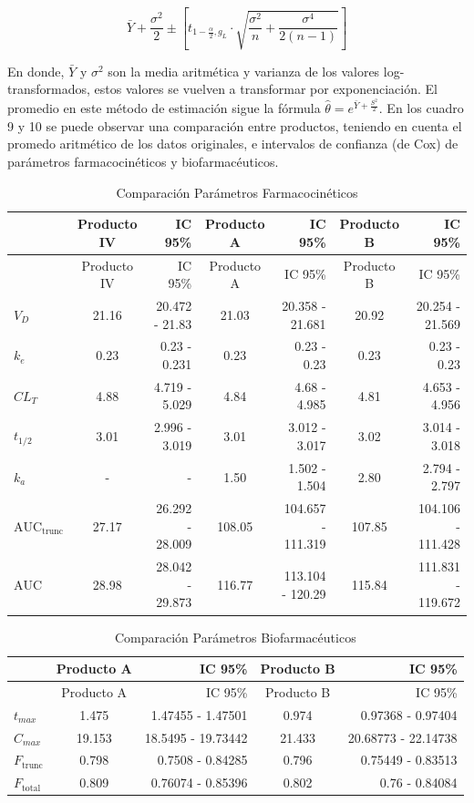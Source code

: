 \documentclass[]{article}
\begin{document}
\[\bar{Y} + \frac{\sigma^{2}}{2} \pm \left [ t_{1-\frac{\alpha}{2},g_{L}} \cdot \sqrt{\frac{\sigma^{2}}{n} + \frac{\sigma^{4}}{2(n-1)}} \right]\]

En donde, \(\bar{Y}\) y \(\sigma^{2}\) son la media aritmética y
varianza de los valores log-transformados, estos valores se vuelven a
transformar por exponenciación. El promedio en este método de estimación
sigue la fórmula \(\hat{\theta} = e^{\bar{Y}+\frac{S^{2}}{2}}\). En los
cuadro 9 y 10 se puede observar una comparación entre productos,
teniendo en cuenta el promedo aritmético de los datos originales, e
intervalos de confianza (de Cox) de parámetros farmacocinéticos y
biofarmacéuticos.

\begin{longtable}[]{@{}lcrcrcr@{}}
\caption{Comparación Parámetros Farmacocinéticos}\tabularnewline
\toprule
& Producto IV & IC 95\% & Producto A & IC 95\% & Producto B & IC
95\%\tabularnewline
\midrule
\endfirsthead
\toprule
& Producto IV & IC 95\% & Producto A & IC 95\% & Producto B & IC
95\%\tabularnewline
\midrule
\endhead
\(V_{D}\) & 21.16 & 20.472 - 21.83 & 21.03 & 20.358 - 21.681 & 20.92 &
20.254 - 21.569\tabularnewline
\(k_{e}\) & 0.23 & 0.23 - 0.231 & 0.23 & 0.23 - 0.23 & 0.23 & 0.23 -
0.23\tabularnewline
\(CL_{T}\) & 4.88 & 4.719 - 5.029 & 4.84 & 4.68 - 4.985 & 4.81 & 4.653 -
4.956\tabularnewline
\(t_{1/2}\) & 3.01 & 2.996 - 3.019 & 3.01 & 3.012 - 3.017 & 3.02 & 3.014
- 3.018\tabularnewline
\(k_{a}\) & - & - & 1.50 & 1.502 - 1.504 & 2.80 & 2.794 -
2.797\tabularnewline
\(\textrm{AUC}_{\textrm{trunc}}\) & 27.17 & 26.292 - 28.009 & 108.05 &
104.657 - 111.319 & 107.85 & 104.106 - 111.428\tabularnewline
\(\textrm{AUC}\) & 28.98 & 28.042 - 29.873 & 116.77 & 113.104 - 120.29 &
115.84 & 111.831 - 119.672\tabularnewline
\bottomrule
\end{longtable}

\begin{longtable}[]{@{}lcrcr@{}}
\caption{Comparación Parámetros Biofarmacéuticos}\tabularnewline
\toprule
& Producto A & IC 95\% & Producto B & IC 95\%\tabularnewline
\midrule
\endfirsthead
\toprule
& Producto A & IC 95\% & Producto B & IC 95\%\tabularnewline
\midrule
\endhead
\(t_{max}\) & 1.475 & 1.47455 - 1.47501 & 0.974 & 0.97368 -
0.97404\tabularnewline
\(C_{max}\) & 19.153 & 18.5495 - 19.73442 & 21.433 & 20.68773 -
22.14738\tabularnewline
\(F_{\textrm{trunc}}\) & 0.798 & 0.7508 - 0.84285 & 0.796 & 0.75449 -
0.83513\tabularnewline
\(F_{\textrm{total}}\) & 0.809 & 0.76074 - 0.85396 & 0.802 & 0.76 -
0.84084\tabularnewline
\bottomrule
\end{longtable}
\end{document}
